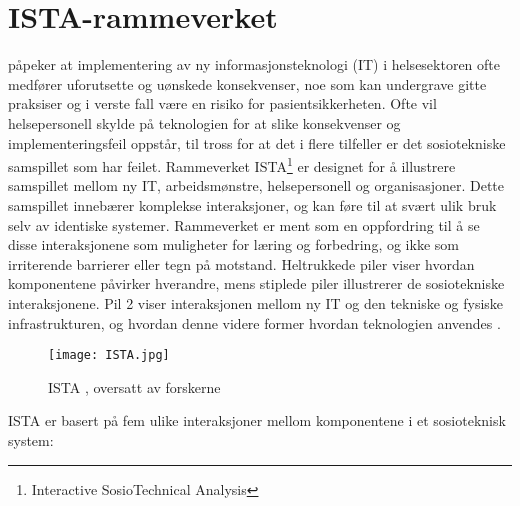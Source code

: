 \section{ISTA-rammeverket}
\label{section:ista-rammeverket}

\citet{Harrison07} påpeker at implementering av ny informasjonsteknologi (IT) i helsesektoren ofte medfører uforutsette og uønskede konsekvenser, noe som kan undergrave gitte praksiser og i verste fall være en risiko for pasientsikkerheten. Ofte vil helsepersonell skylde på teknologien for at slike konsekvenser og implementeringsfeil oppstår, til tross for at det i flere tilfeller er det sosiotekniske samspillet som har feilet. Rammeverket ISTA\footnote{Interactive SosioTechnical Analysis} er designet for å illustrere samspillet mellom ny IT, arbeidsmønstre, helsepersonell og organisasjoner. Dette samspillet innebærer komplekse interaksjoner, og kan føre til at svært ulik bruk selv av identiske systemer. Rammeverket er ment som en oppfordring til å se disse interaksjonene som muligheter for læring og forbedring, og ikke som irriterende barrierer eller tegn på motstand. Heltrukkede piler viser hvordan komponentene påvirker hverandre, mens stiplede piler illustrerer de sosiotekniske interaksjonene. Pil 2 viser interaksjonen mellom ny IT og den tekniske og fysiske infrastrukturen, og hvordan denne videre former hvordan teknologien anvendes \citep{Harrison07}.

\begin{figure}[H]
\centering
\texttt{[image: ISTA.jpg]}
\caption{ISTA \citep{Harrison}, oversatt av forskerne}
\label{fig:ISTA}
\end{figure}

\noindent
ISTA er basert på fem ulike interaksjoner mellom komponentene i et sosioteknisk system:  


